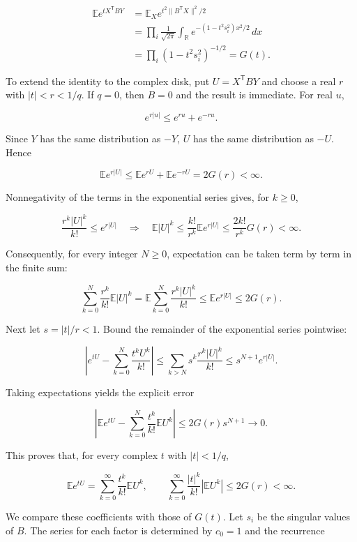\documentclass[11pt,a4paper]{article}
\begin{document}
\[
\begin{aligned}
\mathbb Ee^{tX^{\mathsf T}BY}
&=\mathbb E_Xe^{t^2\|B^{\mathsf T}X\|^2/2}\\
&=\prod_i\frac1{\sqrt{2\pi}}\int_{\mathbb R}
e^{-(1-t^2s_i^2)x^2/2}\,dx\\
&=\prod_i(1-t^2s_i^2)^{-1/2}=G(t).
\end{aligned}
\]

To extend the identity to the complex disk, put \(U=X^{\mathsf T}BY\) and choose a real \(r\) with \(|t|<r<1/q\). If \(q=0\), then \(B=0\) and the result is immediate. For real \(u\),

\[
e^{r|u|}\le e^{ru}+e^{-ru}.
\]

Since \(Y\) has the same distribution as \(-Y\), \(U\) has the same distribution as \(-U\). Hence

\[
\mathbb E e^{r|U|}
\le\mathbb E e^{rU}+\mathbb E e^{-rU}
=2G(r)<\infty.
\]

Nonnegativity of the terms in the exponential series gives, for \(k\ge0\),

\[
\frac{r^k|U|^k}{k!}\le e^{r|U|}
\quad\Longrightarrow\quad
\mathbb E|U|^k\le\frac{k!}{r^k}\mathbb Ee^{r|U|}
\le\frac{2k!}{r^k}G(r)<\infty.
\]

Consequently, for every integer \(N\ge0\), expectation can be taken term by term in the finite sum:

\[
\sum_{k=0}^{N}\frac{r^k}{k!}\mathbb E|U|^k
=\mathbb E\sum_{k=0}^{N}\frac{r^k|U|^k}{k!}
\le\mathbb Ee^{r|U|}\le2G(r).
\]

Next let \(s=|t|/r<1\). Bound the remainder of the exponential series pointwise:

\[
\left|e^{tU}-\sum_{k=0}^{N}\frac{t^kU^k}{k!}\right|
\le\sum_{k>N}s^k\frac{r^k|U|^k}{k!}
\le s^{N+1}e^{r|U|}.
\]

Taking expectations yields the explicit error

\[
\left|\mathbb Ee^{tU}-\sum_{k=0}^{N}\frac{t^k}{k!}\mathbb EU^k\right|
\le2G(r)s^{N+1}\longrightarrow0.
\]

This proves that, for every complex \(t\) with \(|t|<1/q\),

\[
\mathbb E e^{tU}
=\sum_{k=0}^{\infty}\frac{t^k}{k!}\mathbb E U^k,
\qquad
\sum_{k=0}^{\infty}\frac{|t|^k}{k!}|\mathbb E U^k|
\le2G(r)<\infty.
\]

We compare these coefficients with those of \(G(t)\). Let \(s_i\) be the singular values of \(B\). The series for each factor is determined by \(c_0=1\) and the recurrence
\end{document}

